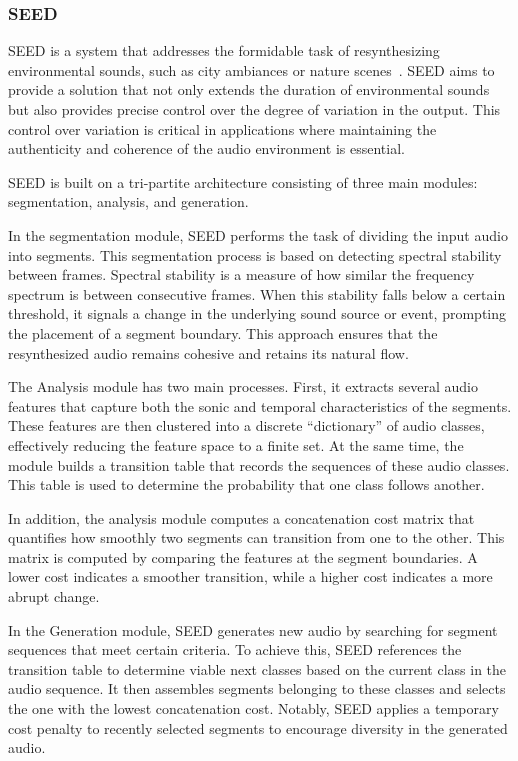 \subsubsection{SEED}

SEED is a system that addresses the formidable task of resynthesizing environmental sounds, such as city ambiances or nature scenes~\cite{bernardes_seed_2016}. SEED aims to provide a solution that not only extends the duration of environmental sounds but also provides precise control over the degree of variation in the output. This control over variation is critical in applications where maintaining the authenticity and coherence of the audio environment is essential.

SEED is built on a tri-partite architecture consisting of three main modules: segmentation, analysis, and generation. 

In the segmentation module, SEED performs the task of dividing the input audio into segments. This segmentation process is based on detecting spectral stability between frames. Spectral stability is a measure of how similar the frequency spectrum is between consecutive frames. When this stability falls below a certain threshold, it signals a change in the underlying sound source or event, prompting the placement of a segment boundary. This approach ensures that the resynthesized audio remains cohesive and retains its natural flow.

The Analysis module has two main processes. First, it extracts several audio features that capture both the sonic and temporal characteristics of the segments. These features are then clustered into a discrete ``dictionary'' of audio classes, effectively reducing the feature space to a finite set. At the same time, the module builds a transition table that records the sequences of these audio classes. This table is used to determine the probability that one class follows another.

In addition, the analysis module computes a concatenation cost matrix that quantifies how smoothly two segments can transition from one to the other. This matrix is computed by comparing the features at the segment boundaries. A lower cost indicates a smoother transition, while a higher cost indicates a more abrupt change.

In the Generation module, SEED generates new audio by searching for segment sequences that meet certain criteria. To achieve this, SEED references the transition table to determine viable next classes based on the current class in the audio sequence. It then assembles segments belonging to these classes and selects the one with the lowest concatenation cost. Notably, SEED applies a temporary cost penalty to recently selected segments to encourage diversity in the generated audio.

